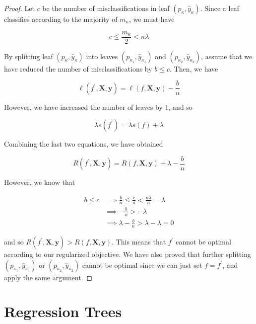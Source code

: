 \documentclass{article}
\begin{document}
    \begin{proof}
    Let $c$ be the number of misclassifications in leaf $(p_{\kappa}, \hat{y}_{\kappa})$. Since a leaf classifies according to the majority of $m_{\kappa}$, we must have 

      \[c \leq \frac{m_\kappa}{2} < n \lambda\]

    By splitting leaf $(p_\kappa, \hat{y}_\kappa)$ into leaves $(p_{\kappa_1}, \hat{y}_{\kappa_1})$ and $(p_{\kappa_2}, \hat{y}_{\kappa_2})$, assume that we have reduced the number of misclassifications by $b \leq c$. Then, we have 

      \[\ell(f^\prime, \mathbf{X}, \mathbf{y}) = \ell(f, \mathbf{X}, \mathbf{y}) - \frac{b}{n}\]

    However, we have increased the number of leaves by $1$, and so 

      \[\lambda s(f^\prime) = \lambda s(f) + \lambda\]

    Combining the last two equations, we have obtained 

      \[R (f^\prime, \mathbf{X}, \mathbf{y}) = R(f, \mathbf{X}, \mathbf{y}) + \lambda - \frac{b}{n}\]

    However, we know that 

    \begin{align*}
      b \leq c & \implies \frac{b}{n} \leq \frac{c}{n} < \frac{n \lambda}{n} = \lambda \\
      & \implies - \frac{b}{n} > - \lambda \\
      & \implies \lambda - \frac{b}{n} > \lambda - \lambda = 0
    \end{align*}

    and so $R (f^\prime, \mathbf{X}, \mathbf{y}) > R(f, \mathbf{X}, \mathbf{y})$. This means that $f^\prime$ cannot be optimal according to our regularized objective. We have also proved that further splitting $(p_{\kappa_1}, \hat{y}_{\kappa_1})$ or $(p_{\kappa_2}, \hat{y}_{\kappa_2})$ cannot  be optimal since we can just set $f = f^\prime$, and apply the same argument. 
    \end{proof}

\section{Regression Trees}



\end{document}
